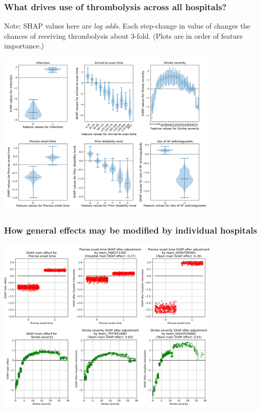 \documentclass{beamer}
\begin{document}

\begin{frame}
\frametitle{What drives use of thrombolysis across all hospitals?}

\footnotesize{Note: SHAP values here are \emph{log odds}. Each step-change in value of  changes the chances of receiving thrombolysis about 3-fold. (Plots are in order of feature importance.)}

\begin{center}
\includegraphics[width=0.80\textwidth]{./images/03_xgb_10_features_thrombolysis_shap_violin.jpg}
\end{center}
\end{frame}


\begin{frame}
\frametitle{How general effects may be modified by individual hospitals}

\begin{center}
\includegraphics[width=0.80\textwidth]{./images/12aa_two_way_shap_adjustment.jpg}
\end{center}
\end{frame}
\end{document}
